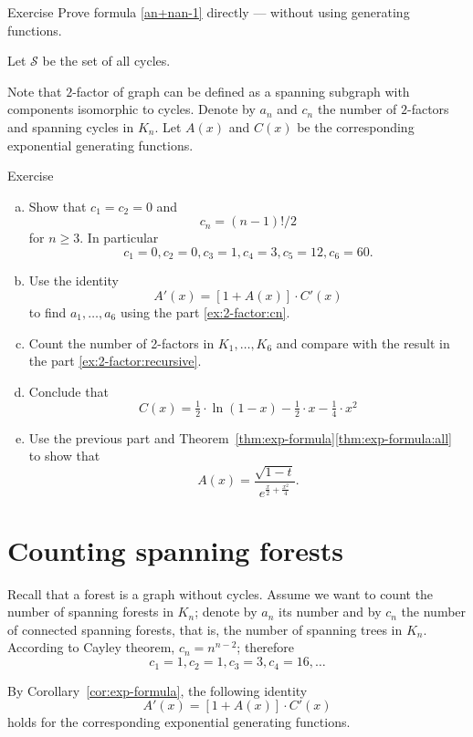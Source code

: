 \begin{thm}{Exercise}
Prove formula \ref{an+nan-1} directly --- without using generating functions.
\end{thm}

Let $\mathcal{S}$ be the set of all cycles.

Note that $2$-factor of graph can be defined as a spanning subgraph with components isomorphic to cycles.
Denote by $a_n$ and $c_n$ the number of $2$-factors and spanning cycles in $K_n$.
Let $A(x)$ and $C(x)$ be the corresponding exponential generating functions.

\begin{thm}{Exercise}
\begin{enumerate}[(a)]
\item\label{ex:2-factor:cn} Show that $c_1=c_2=0$ and 
\[c_n=(n-1)!/2\]
for $n\ge 3$.
In particular 
\[c_1=0, c_2=0, c_3=1, c_4=3, c_5=12, c_6=60.\]
\item\label{ex:2-factor:recursive} Use the identity
\[A'(x)=[1+A(x)]\cdot C'(x)\]
to find $a_1,\dots, a_6$ using the part \ref{ex:2-factor:cn}.
\item Count the number of 2-factors in $K_1,\dots ,K_6$ and compare with the result in the part \ref{ex:2-factor:recursive}.
\item Conclude that 
\[C(x)=\tfrac12\cdot\ln(1-x)-\tfrac12\cdot x-\tfrac14\cdot x^2\]
\item Use the previous part and Theorem~\ref{thm:exp-formula}\ref{thm:exp-formula:all}
to show that
\[A(x)=\frac{\sqrt{1-t}}{e^{\frac x2+\frac{x^2}4}}.\]


\end{enumerate}

\end{thm}



\section*{Counting spanning forests}

Recall that a forest is a graph without cycles.
Assume we want to count the number of spanning forests in $K_n$;
denote by $a_n$ its number and by $c_n$ the number of connected spanning forests, that is, the number of spanning trees in $K_n$.
According to Cayley theorem, $c_n=n^{n-2}$;
therefore 
\[c_1=1, c_2=1, c_3=3, c_4=16,\dots\]

By Corollary~\ref{cor:exp-formula}, the following identity
\[A'(x)=[1+A(x)]\cdot C'(x)\]
holds for the corresponding exponential generating functions.

